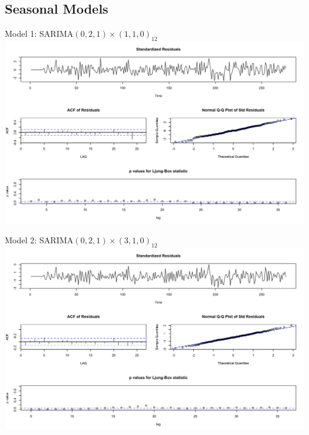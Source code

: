 \documentclass{beamer}
\begin{document}
 \subsection{Seasonal Models}
  \begin{frame}{Model 1: SARIMA\((0,2,1) \times (1,1,0)_{12}\)}
  		\includegraphics[width=\linewidth]{images/seasonalmodel1}
  \end{frame}


\begin{frame}{Model 2: SARIMA\((0,2,1) \times (3,1,0)_{12}\)}
  		\includegraphics[width=\linewidth]{images/seasonalmodel2}
  \end{frame}  

  
\end{document}
